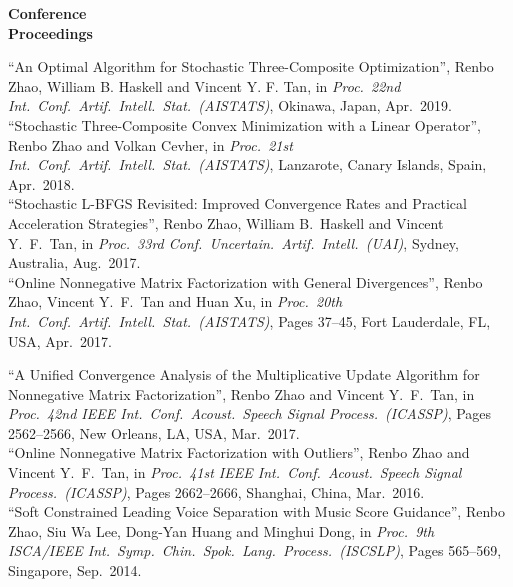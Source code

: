 \documentclass[11pt]{article}
\newcommand{\ICASSP}{IEEE Int.\ Conf.\ Acoust.\ Speech Signal Process.\ (ICASSP)}
\newcommand{\AISTATS}{Int.\ Conf.\ Artif.\ Intell.\ Stat.\ (AISTATS)}
\newcommand{\UAI}{Conf.\ Uncertain.\ Artif.\ Intell.\ (UAI)}
\begin{document}
\begin{minipage}[t]{0.18\textwidth}
\textbf{Conference \\Proceedings}
\end{minipage}
\begin{minipage}[t]{0.8\textwidth}
``An Optimal Algorithm for Stochastic Three-Composite Optimization'', {Renbo Zhao}, William B. Haskell and Vincent Y. F. Tan,  in {\em Proc.\ 22nd \AISTATS}, Okinawa, Japan, Apr.\ 2019.\\[.2cm] 
``Stochastic Three-Composite Convex Minimization with a Linear Operator'', {Renbo Zhao} and Volkan Cevher, in {\em Proc.\ 21st \AISTATS},  Lanzarote,  Canary Islands, Spain, Apr.\ 2018.  %
\\[.2cm]
``Stochastic L-BFGS Revisited: Improved Convergence Rates and Practical Acceleration Strategies'', {Renbo Zhao}, William B.\ Haskell and Vincent Y.\ F.\ Tan, in {\em Proc.\ 33rd \UAI}, Sydney, Australia, Aug.\ 2017. %
\\[.2cm]
``Online Nonnegative Matrix Factorization with General Divergences'', {Renbo Zhao}, Vincent Y.\ F.\ Tan and Huan Xu, in {\em Proc.\ 20th \AISTATS}, Pages 37--45, Fort Lauderdale, FL, USA, Apr.\ 2017.  %
\\[.2cm]
\end{minipage}


\begin{minipage}[t]{0.18\textwidth}
\textbf{\phantom{Conference \\Proceedings}}
\end{minipage}\hfill
\begin{minipage}[t]{0.79\textwidth}
``A Unified Convergence Analysis of the Multiplicative Update Algorithm for Nonnegative Matrix Factorization'', {Renbo Zhao} and Vincent Y.\ F.\ Tan, in {\em Proc.\ 42nd \ICASSP}, Pages 2562--2566, New Orleans, LA, USA, Mar.\ 2017. %
\\[.2cm]
``Online Nonnegative Matrix Factorization with Outliers'', {Renbo Zhao} and Vincent Y.\ F.\ Tan, in  {\em Proc.\ 41st \ICASSP}, Pages 2662--2666, Shanghai, China, Mar.\ 2016. %
\\[.2cm]
``Soft Constrained Leading Voice Separation with Music Score Guidance'', {Renbo Zhao}, Siu Wa Lee, Dong-Yan Huang and Minghui Dong, in {\em Proc.\ 9th ISCA/IEEE Int.\ Symp.\ Chin.\ Spok.\ Lang.\ Process.\ (ISCSLP)}, Pages 565--569, Singapore, Sep.\ 2014. %
\end{minipage} \newline\newline
\end{document}
